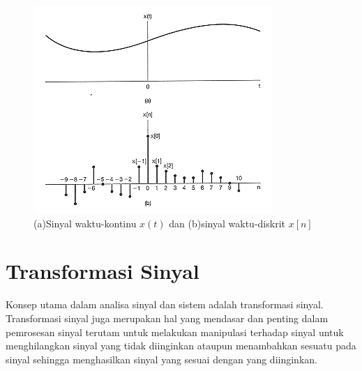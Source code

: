 \begin{figure}[!h]
\centering
\includegraphics[scale=0.9]{pict/kontinudiskrit}
\caption{(a)Sinyal waktu-kontinu $x(t)$ dan (b)sinyal waktu-diskrit $x[n]$}\label{kontinudiskrit}
\end{figure}

\section{Transformasi Sinyal}
Konsep utama dalam analisa sinyal dan sistem adalah transformasi sinyal. Transformasi sinyal juga merupakan hal yang mendasar dan penting dalam pemrosesan sinyal terutam untuk melakukan manipulasi terhadap sinyal untuk menghilangkan sinyal yang tidak diinginkan ataupun menambahkan sesuatu pada sinyal sehingga menghasilkan sinyal yang sesuai dengan yang diinginkan. 
